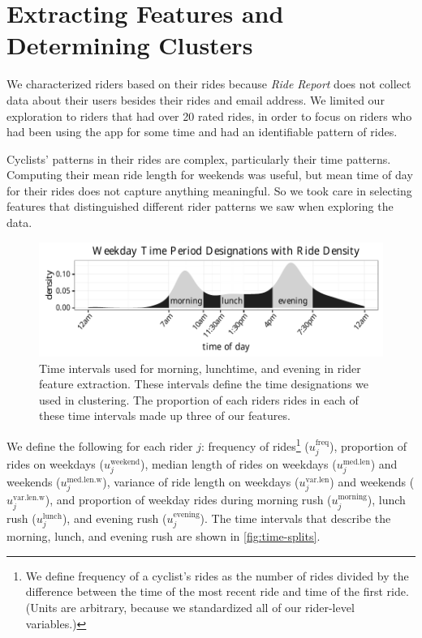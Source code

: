 \documentclass[12pt,twoside]{reedthesis}
\begin{document}
  \section{Extracting Features and Determining
  Clusters}\label{extracting-features-and-determining-clusters}
  
  We characterized riders based on their rides because \emph{Ride Report}
  does not collect data about their users besides their rides and email
  address. We limited our exploration to riders that had over 20 rated
  rides, in order to focus on riders who had been using the app for some
  time and had an identifiable pattern of rides.
  
  Cyclists' patterns in their rides are complex, particularly their time
  patterns. Computing their mean ride length for weekends was useful, but
  mean time of day for their rides does not capture anything meaningful.
  So we took care in selecting features that distinguished different rider
  patterns we saw when exploring the data.
  
  \begin{figure}[htb]
  \centering
  \includegraphics{figure/time-designations.pdf}
  \caption[Time intervals used for morning, lunchtime, and evening in rider feature
  extraction]{Time intervals used for morning, lunchtime, and evening in rider feature
  extraction. These intervals define the time designations we used in clustering. 
  The proportion of each riders rides in each of these time intervals made up three
  of our features.\label{fig:time-splits}}
  \end{figure}
  
  We define the following for each rider \(j\): frequency of
  rides\footnote{We define frequency of a cyclist's rides as the number of
    rides divided by the difference between the time of the most recent
    ride and time of the first ride. (Units are arbitrary, because we
    standardized all of our rider-level variables.)}
  (\(u^\text{freq}_j\)), proportion of rides on weekdays
  (\(u^\text{weekend}_j\)), median length of rides on weekdays
  (\(u^\text{med.len}_j\)) and weekends (\(u^\text{med.len.w}_j\)),
  variance of ride length on weekdays (\(u^\text{var.len}_j\)) and
  weekends (\(u^\text{var.len.w}_j\)), and proportion of weekday rides
  during morning rush (\(u^\text{morning}_j\)), lunch rush
  (\(u^\text{lunch}_j\)), and evening rush (\(u^\text{evening}_j\)). The
  time intervals that describe the morning, lunch, and evening rush are
  shown in \autoref{fig:time-splits}.
  
\end{document}
